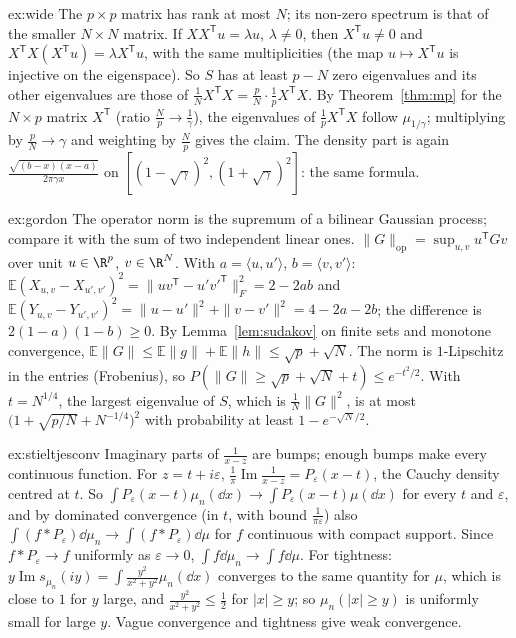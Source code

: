 \begin{solution}{ex:wide}
\idea The $p\times p$ matrix has rank at most $N$; its non-zero spectrum is that of the smaller $N\times N$ matrix.
\writeup If $XX^{\mathsf T}u=\lambda u$, $\lambda\ne0$, then $X^{\mathsf T}u\ne0$ and $X^{\mathsf T}X(X^{\mathsf T}u)=\lambda X^{\mathsf T}u$, with the same multiplicities (the map $u\mapsto X^{\mathsf T}u$ is injective on the eigenspace). So $S$ has at least
$p-N$ zero eigenvalues and its other eigenvalues are those of $\frac1NX^{\mathsf T}X=\frac pN\cdot\frac1pX^{\mathsf T}X$. By Theorem~\ref{thm:mp} for the $N\times p$ matrix $X^{\mathsf T}$ (ratio $\frac Np\to\frac1\gamma$), the eigenvalues of
$\frac1pX^{\mathsf T}X$ follow $\mu_{1/\gamma}$; multiplying by $\frac pN\to\gamma$ and weighting by $\frac Np$ gives the claim. The density part is again $\frac{\sqrt{(b-x)(x-a)}}{2\pi\gamma x}$ on $[(1-\sqrt\gamma)^2,(1+\sqrt\gamma)^2]$: the same formula.
\end{solution}

\begin{solution}{ex:gordon}
\idea The operator norm is the supremum of a bilinear Gaussian process; compare it with the sum of two independent linear ones.
\writeup $\|G\|_{\mathrm{op}}=\sup_{u,v}u^{\mathsf T}Gv$ over unit $u\in\R^p$, $v\in\R^N$. With $a=\langle u,u'\rangle$, $b=\langle v,v'\rangle$: $\mathbb E(X_{u,v}-X_{u',v'})^2=\|uv^{\mathsf T}-u'v'^{\mathsf T}\|_F^2=2-2ab$ and
$\mathbb E(Y_{u,v}-Y_{u',v'})^2=\|u-u'\|^2+\|v-v'\|^2=4-2a-2b$; the difference is $2(1-a)(1-b)\ge0$. By Lemma~\ref{lem:sudakov} on finite sets and monotone convergence, $\mathbb E\|G\|\le\mathbb E\|g\|+\mathbb E\|h\|\le\sqrt p+\sqrt N$. The norm is
$1$-Lipschitz in the entries (Frobenius), so $P(\|G\|\ge\sqrt p+\sqrt N+t)\le e^{-t^2/2}$. With $t=N^{1/4}$, the largest eigenvalue of $S$, which is $\frac1N\|G\|^2$, is at most $\bigl(1+\sqrt{p/N}+N^{-1/4}\bigr)^2$ with probability at least
$1-e^{-\sqrt N/2}$.
\end{solution}

\begin{solution}{ex:stieltjesconv}
\idea Imaginary parts of $\frac1{x-z}$ are bumps; enough bumps make every continuous function.
\writeup For $z=t+i\varepsilon$, $\frac1\pi\operatorname{Im}\frac1{x-z}=P_\varepsilon(x-t)$, the Cauchy density centred at $t$. So $\int P_\varepsilon(x-t)\mu_n(\dd x)\to\int P_\varepsilon(x-t)\mu(\dd x)$ for every $t$ and $\varepsilon$, and by dominated convergence (in $t$, with
bound $\frac1{\pi\varepsilon}$) also $\int(f*P_\varepsilon)\dd\mu_n\to\int(f*P_\varepsilon)\dd\mu$ for $f$ continuous with compact support. Since $f*P_\varepsilon\to f$ uniformly as $\varepsilon\to0$, $\int f\dd\mu_n\to\int f\dd\mu$. For tightness:
$y\operatorname{Im}s_{\mu_n}(iy)=\int\frac{y^2}{x^2+y^2}\mu_n(\dd x)$ converges to the same quantity for $\mu$, which is close to $1$ for $y$ large, and $\frac{y^2}{x^2+y^2}\le\frac12$ for $|x|\ge y$; so $\mu_n(|x|\ge y)$ is uniformly small
for large $y$. Vague convergence and tightness give weak convergence.
\end{solution}

